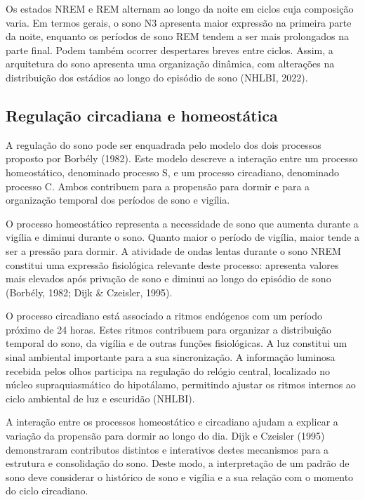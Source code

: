 Os estados NREM e REM alternam ao longo da noite em ciclos cuja composição varia. Em termos gerais, o sono N3 apresenta maior expressão na primeira parte da noite, enquanto os períodos de sono REM tendem a ser mais prolongados na parte final. Podem também ocorrer despertares breves entre ciclos. Assim, a arquitetura do sono apresenta uma organização dinâmica, com alterações na distribuição dos estádios ao longo do episódio de sono (NHLBI, 2022).

\subsection{Regulação circadiana e homeostática}
\label{sec:chap2_regulacaoCircadiana}

A regulação do sono pode ser enquadrada pelo modelo dos dois processos proposto por Borbély (1982). Este modelo descreve a interação entre um processo homeostático, denominado processo S, e um processo circadiano, denominado processo C. Ambos contribuem para a propensão para dormir e para a organização temporal dos períodos de sono e vigília.

O processo homeostático representa a necessidade de sono que aumenta durante a vigília e diminui durante o sono. Quanto maior o período de vigília, maior tende a ser a pressão para dormir. A atividade de ondas lentas durante o sono NREM constitui uma expressão fisiológica relevante deste processo: apresenta valores mais elevados após privação de sono e diminui ao longo do episódio de sono (Borbély, 1982; Dijk \& Czeisler, 1995).

O processo circadiano está associado a ritmos endógenos com um período próximo de 24 horas. Estes ritmos contribuem para organizar a distribuição temporal do sono, da vigília e de outras funções fisiológicas. A luz constitui um sinal ambiental importante para a sua sincronização. A informação luminosa recebida pelos olhos participa na regulação do relógio central, localizado no núcleo supraquiasmático do hipotálamo, permitindo ajustar os ritmos internos ao ciclo ambiental de luz e escuridão (NHLBI).

A interação entre os processos homeostático e circadiano ajudam a explicar a variação da propensão para dormir ao longo do dia. Dijk e Czeisler (1995) demonstraram contributos distintos e interativos destes mecanismos para a estrutura e consolidação do sono. Deste modo, a interpretação de um padrão de sono deve considerar o histórico de sono e vigília e a sua relação com o momento do ciclo circadiano.

